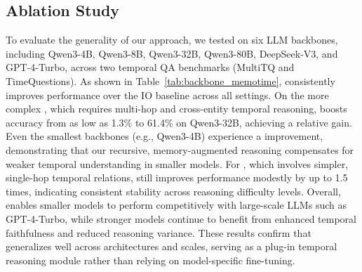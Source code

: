 \subsection{Ablation Study}\label{exp:ablation}

To evaluate the generality of our approach, we tested \mot on six LLM backbones, including Qwen3-4B, Qwen3-8B, Qwen3-32B, Qwen3-80B, DeepSeek-V3, and GPT-4-Turbo, across two temporal QA benchmarks (MultiTQ and TimeQuestions). 
As shown in Table~\ref{tab:backbone_memotime}, \mot consistently improves performance over the IO baseline across all settings. 
On the more complex , which requires multi-hop and cross-entity temporal reasoning, \mot boosts accuracy from as low as 1.3\% to 61.4\% on Qwen3-32B, achieving a  relative gain. 
Even the smallest backbones (e.g., Qwen3-4B) experience a  improvement, demonstrating that our recursive, memory-augmented reasoning compensates for weaker temporal understanding in smaller models.
For , which involves simpler, single-hop temporal relations, \mot still improves performance modestly by up to 1.5 times, indicating consistent stability across reasoning difficulty levels.  
Overall, \mot enables smaller models to perform competitively with large-scale LLMs such as GPT-4-Turbo, while stronger models continue to benefit from enhanced temporal faithfulness and reduced reasoning variance. 
These results confirm that \mot generalizes well across architectures and scales, serving as a plug-in temporal reasoning module rather than relying on model-specific fine-tuning.


